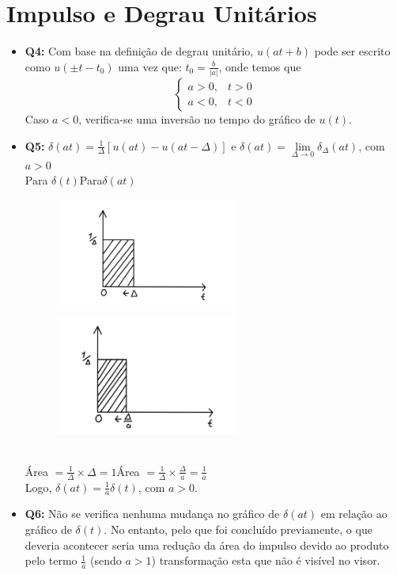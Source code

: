 \documentclass[a4paper, 12pt]{article}
\begin{document}
\section{Impulso e Degrau Unitários}
\begin{itemize}
    \item \textbf{Q4:} Com base na definição de degrau unitário, $u(at+b)$ pode ser escrito como $u(\pm t - t_0)$ uma vez que: $t_0 = \frac{b}{|a|}$, onde temos que
          \[ \begin{cases}
                  a > 0, & t > 0 \\
                  a < 0, & t < 0
              \end{cases} \]
          Caso $a < 0$, verifica-se uma inversão no tempo do gráfico de $u(t)$.
          \newpage
    \item \textbf{Q5:} $\delta(at) = \frac{1}{\Delta}[u(at) - u(at - \Delta)]$ e $\delta(at) = \underset{{\Delta\to0}}{\lim}\delta_\Delta(at)$, com $a > 0$\vspace{15px}\\
          Para $\delta(t)$\hspace{150px}Para$\delta(at)$\\
          \begin{figure}[!ht]
              \includegraphics[width=6cm]{images/Graf1.png}
              \hspace{10px}
              \includegraphics[width=6cm]{images/Graf2.png}
          \end{figure}\\
          Área $ = \frac{1}{\Delta}\times\Delta = 1$\hspace{100px}Área $= \frac{1}{\Delta} \times \frac{\Delta}{a} = \frac{1}{a}$\vspace{15px}\\
          Logo, $\delta(at) = \frac{1}{a}\delta(t)$, com $a > 0$.\vspace{5px}
    \item \textbf{Q6:} Não se verifica nenhuma mudança no gráfico de $\delta(at)$ em relação ao gráfico de $\delta(t)$. No entanto, pelo que foi concluído previamente, o que deveria acontecer seria uma redução da área do impulso devido ao produto pelo termo $\frac{1}{a}$ (sendo $a > 1$) transformação esta que não é visível no visor.
\end{itemize}
\newpage
\end{document}
